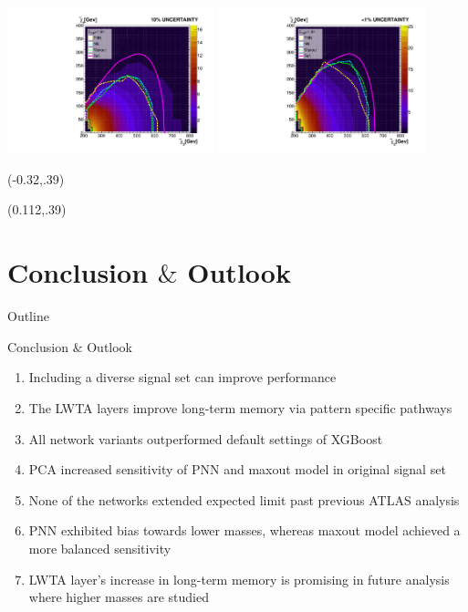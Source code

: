 \documentclass[UKenglish]{beamer}
\begin{document}
\begin{frame}
    \vfill
    \centering
    \includegraphics[width=0.45\textwidth]{figures/Limits/compLimit10.pdf}
    \includegraphics[width=0.45\textwidth]{figures/Limits/compLimit1.pdf}
    \begin{textblock}{1}(-0.32,.39)
        \tiny
        \cite{atlas_search_2021}
    \end{textblock}
    \begin{textblock}{1}(0.112,.39)
        \tiny
        \cite{atlas_search_2021}
    \end{textblock}
\end{frame}
\section{Conclusion $\&$ Outlook}
\begin{frame}{Outline}
    \tableofcontents[currentsection]
\end{frame}
\begin{frame}{Conclusion $\&$ Outlook}
    \begin{enumerate}
        \item Including a diverse signal set can improve performance
        \item The LWTA layers improve long-term memory via pattern specific pathways
        \item All network variants outperformed default settings of XGBoost
        \item PCA increased sensitivity of PNN and maxout model in original signal set
        \item None of the networks extended expected limit past previous ATLAS analysis
        \item PNN exhibited bias towards lower masses, whereas maxout model achieved a more balanced 
              sensitivity
        \item LWTA layer's increase in long-term memory is promising in future analysis 
              where higher masses are studied 
    \end{enumerate}
\end{frame}
\end{document}
